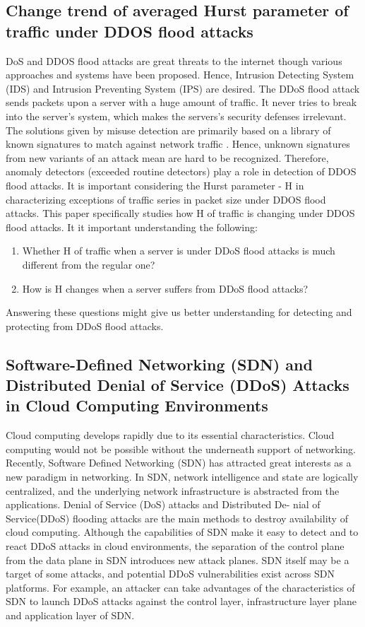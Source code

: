 \documentclass{report}
\begin{document}
\subsection {Change trend of averaged Hurst parameter of traffic under DDOS flood attacks}
DoS and DDOS flood attacks are great threats to the internet though various approaches and systems have been proposed. Hence, Intrusion Detecting System (IDS) and Intrusion Preventing System (IPS) are desired. The DDoS flood attack sends packets upon a server with a huge amount of traffic. It never tries to break into the server’s system, which makes the servers’s security defenses irrelevant.
\hfill \break
The solutions given by misuse detection are primarily based on a library of known signatures to match against network traffic . Hence, unknown signatures from new variants of an attack mean are hard to be recognized. Therefore, anomaly detectors (exceeded routine detectors) play a role in detection of DDOS flood attacks.
\hfill \break
It is important considering the Hurst parameter - H in characterizing exceptions of traffic series in packet size under DDOS flood attacks. This paper specifically  \cite{Hurst} studies how H of traffic is changing under DDOS flood attacks. It it important understanding the following:
\begin{enumerate}
\item Whether H of traffic when a server is under DDoS flood attacks is much different from the regular one?
\item How is H changes when a server suffers from DDoS flood attacks?
\end{enumerate}
Answering these questions might give us better understanding for detecting and protecting from DDoS flood attacks.
\hfill \break

\subsection{Software-Defined Networking (SDN) and Distributed Denial of Service (DDoS) Attacks in Cloud Computing Environments }
Cloud computing develops rapidly due to its essential characteristics. Cloud computing would not be possible without the underneath support of networking. Recently, Software Defined Networking (SDN)  \cite{SDN} has attracted great interests as a new paradigm in networking. In SDN, network intelligence and state are logically centralized, and the underlying network infrastructure is abstracted from the applications. Denial of Service (DoS) attacks and Distributed De-
nial of Service(DDoS) flooding attacks are the main methods to destroy availability of cloud computing.
Although the capabilities of SDN make it easy to detect and to react DDoS attacks in cloud environments, the separation of the control plane from the data plane in SDN introduces new attack planes. SDN itself may be a target of some attacks, and potential DDoS vulnerabilities exist across SDN platforms. For example, an attacker can take advantages of the characteristics of SDN to launch DDoS attacks against the control layer, infrastructure layer plane and application layer of SDN.
\newpage
\end{document}
